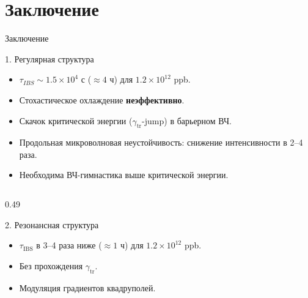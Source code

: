 \section{Заключение}

\begin{frame}{Заключение}
	\footnotesize %
	\setlength{\leftmargini}{1.2em} %
	\begin{block}{1. Регулярная структура}
		\begin{itemize}
			\setlength{\itemsep}{0pt} %
			\item $\tau_{IBS} \sim 1.5\times10^{4}$ с ($\approx 4$ ч) для $1.2 \times 10^{12}$ ppb.
			\item Стохастическое охлаждение \textbf{неэффективно}.
			\item Скачок критической энергии ($\gamma_{\text{tr}}$-jump) в барьерном ВЧ.
			\item Продольная микроволновая неустойчивость: снижение интенсивности в 2--4 раза.
			\item Необходима ВЧ-гимнастика выше критической энергии.
		\end{itemize}
	\end{block}
	
	\vspace{-0.5cm} %
	\begin{columns}[t]
		\begin{column}{0.49\textwidth}
			\begin{block}{2. Резонансная структура}
				\scriptsize %
				\begin{itemize}
					\setlength{\itemsep}{0pt}
					\item $\tau_{\text{IBS}}$ в 3--4 раза ниже ($\approx 1$ ч) для $1.2 \times 10^{12}$ ppb.
					\item Без прохождения $\gamma_{\text{tr}}$.
					\item Модуляция градиентов квадруполей.
				\end{itemize}
			\end{block}
		\end{column}
		

\end{columns}
\end{frame}
